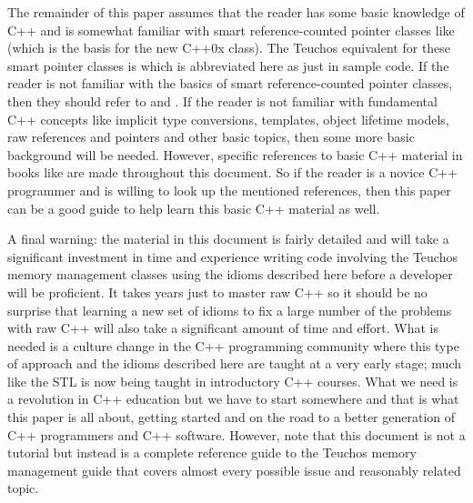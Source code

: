 \documentclass[pdf,ps2pdf,11pt]{SANDreport}
\begin{document}
The remainder of this paper assumes that the reader has some basic
knowledge of C++ and is somewhat familiar with smart reference-counted
pointer classes like {} (which is the basis
for the new C++0x {} class).  The Teuchos
equivalent for these smart pointer classes is {}
which is abbreviated here as just {} in sample code.  If the
reader is not familiar with the basics of smart reference-counted
pointer classes, then they should refer to
{}\cite{RefCountPtrBeginnersGuide} and {}\cite{C++CodingStandards05}.
If the reader is not familiar with fundamental C++ concepts like
implicit type conversions, templates, object lifetime models, raw
references and pointers and other basic topics, then some more basic
background will be needed.  However, specific references to basic C++
material in books like {}\cite{EffectiveC++ThirdEdition, stroustrup97,
C++CodingStandards05} are made throughout this document.  So if the
reader is a novice C++ programmer and is willing to look up the
mentioned references, then this paper can be a good guide to help
learn this basic C++ material as well.

A final warning: the material in this document is fairly detailed and
will take a significant investment in time and experience writing code
involving the Teuchos memory management classes using the idioms
described here before a developer will be proficient.  It takes years
just to master raw C++ so it should be no surprise that learning a new
set of idioms to fix a large number of the problems with raw C++ will
also take a significant amount of time and effort.  What is needed is
a culture change in the C++ programming community where this type of
approach and the idioms described here are taught at a very early
stage; much like the STL is now being taught in introductory C++
courses.  What we need is a revolution in C++ education but we have to
start somewhere and that is what this paper is all about, getting
started and on the road to a better generation of C++ programmers and
C++ software.  However, note that this document is not a tutorial but
instead is a complete reference guide to the Teuchos memory management
guide that covers almost every possible issue and reasonably related
topic.
\end{document}
